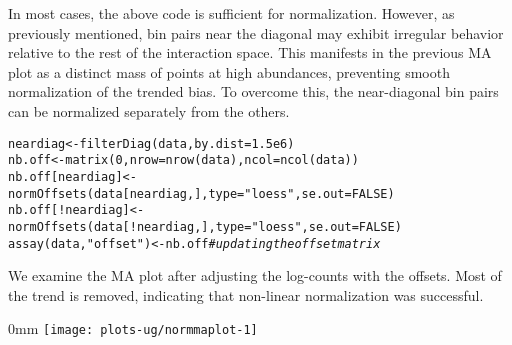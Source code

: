 \documentclass{report}\usepackage[]{graphicx}\usepackage[usenames,dvipsnames]{color}
\makeatletter
\def\maxwidth{ %
  \ifdim\Gin@nat@width>\linewidth
    \linewidth
  \else
    \Gin@nat@width
  \fi
}
\newcommand{\hlnum}[1]{\textcolor[rgb]{0.816,0.125,0.439}{#1}}%
\newcommand{\hlstr}[1]{\textcolor[rgb]{0.251,0.627,0.251}{#1}}%
\newcommand{\hlcom}[1]{\textcolor[rgb]{0.502,0.502,0.502}{\textit{#1}}}%
\newcommand{\hlopt}[1]{\textcolor[rgb]{0,0,0}{#1}}%
\newcommand{\hlstd}[1]{\textcolor[rgb]{0.251,0.251,0.251}{#1}}%
\newcommand{\hlkwb}[1]{\textcolor[rgb]{0,0,0}{#1}}%
\newcommand{\hlkwc}[1]{\textcolor[rgb]{0.251,0.251,0.251}{#1}}%
\newcommand{\hlkwd}[1]{\textcolor[rgb]{0.878,0.439,0.125}{#1}}%
\newenvironment{knitrout}{}{} %
\makeatother
\begin{document}
In most cases, the above code is sufficient for normalization.
However, as previously mentioned, bin pairs near the diagonal may exhibit irregular behavior relative to the rest of the interaction space.
This manifests in the previous MA plot as a distinct mass of points at high abundances, preventing smooth normalization of the trended bias.
To overcome this, the near-diagonal bin pairs can be normalized separately from the others.

\begin{knitrout}
\color{fgcolor}\begin{kframe}
\begin{alltt}
\hlstd{neardiag} \hlkwb{<-} \hlkwd{filterDiag}\hlstd{(data,} \hlkwc{by.dist}\hlstd{=}\hlnum{1.5e6}\hlstd{)}
\hlstd{nb.off} \hlkwb{<-} \hlkwd{matrix}\hlstd{(}\hlnum{0}\hlstd{,} \hlkwc{nrow}\hlstd{=}\hlkwd{nrow}\hlstd{(data),} \hlkwc{ncol}\hlstd{=}\hlkwd{ncol}\hlstd{(data))}
\hlstd{nb.off[neardiag]} \hlkwb{<-} \hlkwd{normOffsets}\hlstd{(data[neardiag,],} \hlkwc{type}\hlstd{=}\hlstr{"loess"}\hlstd{,} \hlkwc{se.out}\hlstd{=}\hlnum{FALSE}\hlstd{)}
\hlstd{nb.off[}\hlopt{!}\hlstd{neardiag]} \hlkwb{<-} \hlkwd{normOffsets}\hlstd{(data[}\hlopt{!}\hlstd{neardiag,],} \hlkwc{type}\hlstd{=}\hlstr{"loess"}\hlstd{,} \hlkwc{se.out}\hlstd{=}\hlnum{FALSE}\hlstd{)}
\hlkwd{assay}\hlstd{(data,} \hlstr{"offset"}\hlstd{)} \hlkwb{<-} \hlstd{nb.off} \hlcom{# updating the offset matrix}
\end{alltt}
\end{kframe}
\end{knitrout}

We examine the MA plot after adjusting the log-counts with the offsets.
Most of the trend is removed, indicating that non-linear normalization was successful.



\begin{knitrout}
\color{fgcolor}\begin{adjustwidth}{\fltoffset}{0mm}
\texttt{[image: plots-ug/normmaplot-1]} \end{adjustwidth}
\end{knitrout}
\end{document}
